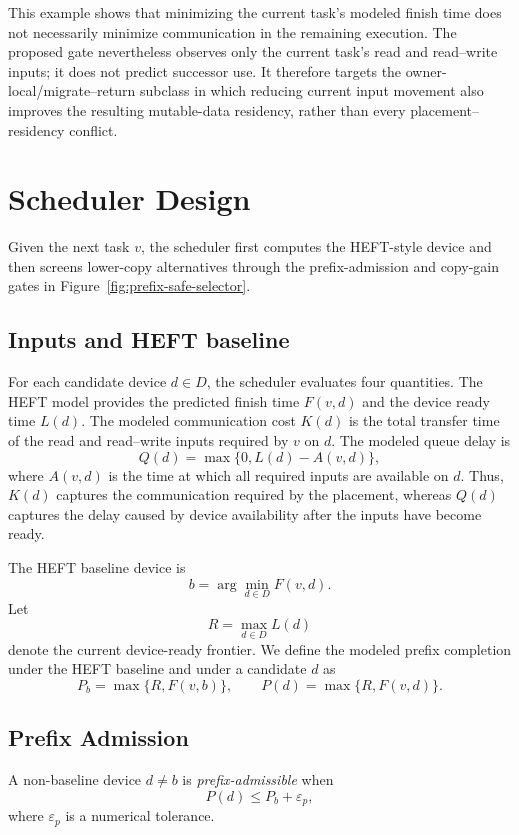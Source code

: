 \documentclass[sigconf]{acmart}
\begin{document}
This example shows that minimizing the current task's modeled finish time does not necessarily minimize communication in the remaining execution. The proposed gate nevertheless observes only the current task's read and read--write inputs; it does not predict successor use. It therefore targets the owner-local/migrate--return subclass in which reducing current input movement also improves the resulting mutable-data residency, rather than every placement--residency conflict.

\section{Scheduler Design}\label{sec:scheduler-design}

Given the next task \(v\), the scheduler first computes the HEFT-style device and then screens lower-copy alternatives through the prefix-admission and copy-gain gates in Figure~\ref{fig:prefix-safe-selector}.

\subsection{Inputs and HEFT baseline}\label{sec:inputs-baseline}

For each candidate device \(d\in D\), the scheduler evaluates four quantities. The HEFT model provides the predicted finish time \(F(v,d)\) and the device ready time \(L(d)\). The modeled communication cost \(K(d)\) is the total transfer time of the read and read--write inputs required by \(v\) on \(d\). The modeled queue delay is
\[
Q(d)=\max\{0,L(d)-A(v,d)\},
\]
where \(A(v,d)\) is the time at which all required inputs are available on \(d\). Thus, \(K(d)\) captures the communication required by the placement, whereas \(Q(d)\) captures the delay caused by device availability after the inputs have become ready.

The HEFT baseline device is
\[
b=\arg\min_{d\in D}F(v,d).
\]
Let
\[
R=\max_{d\in D}L(d)
\]
denote the current device-ready frontier. We define the modeled prefix completion under the HEFT baseline and under a candidate \(d\) as
\[
P_b=\max\{R,F(v,b)\},
\qquad
P(d)=\max\{R,F(v,d)\}.
\]

\subsection{Prefix Admission}\label{sec:prefix-admission}

A non-baseline device \(d\ne b\) is \emph{prefix-admissible} when
\[
P(d)\le P_b+\varepsilon_p,
\]
where \(\varepsilon_p\) is a numerical tolerance.
\end{document}
